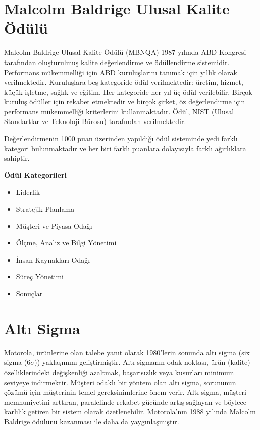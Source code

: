 \documentclass[
]{book}
\providecommand{\tightlist}{%
  \setlength{\itemsep}{0pt}\setlength{\parskip}{0pt}}
\begin{document}
\hypertarget{malcolm-baldrige-ulusal-kalite-uxf6duxfcluxfc}{%
\section{Malcolm Baldrige Ulusal Kalite Ödülü}\label{malcolm-baldrige-ulusal-kalite-uxf6duxfcluxfc}}

Malcolm Baldrige Ulusal Kalite Ödülü (MBNQA) 1987 yılında ABD Kongresi tarafından oluşturulmuş kalite değerlendirme ve ödüllendirme sistemidir. Performans mükemmelliği için ABD kuruluşlarını tanımak için yıllık olarak verilmektedir. Kuruluşlara beş kategoride ödül verilmektedir: üretim, hizmet, küçük işletme, sağlık ve eğitim. Her kategoride her yıl üç ödül verilebilir. Birçok kuruluş ödüller için rekabet etmektedir ve birçok şirket, öz değerlendirme için performans mükemmelliği kriterlerini kullanmaktadır. Ödül, NIST (Ulusal Standartlar ve Teknoloji Bürosu) tarafından verilmektedir.

Değerlendirmenin 1000 puan üzerinden yapıldığı ödül sisteminde yedi farklı kategori bulunmaktadır ve her biri farklı puanlara dolayısıyla farklı ağırlıklara sahiptir.

\textbf{Ödül Kategorileri}

\begin{itemize}
\tightlist
\item
  Liderlik
\item
  Stratejik Planlama
\item
  Müşteri ve Piyasa Odağı
\item
  Ölçme, Analiz ve Bilgi Yönetimi
\item
  İnsan Kaynakları Odağı
\item
  Süreç Yönetimi
\item
  Sonuçlar
\end{itemize}

\hypertarget{altux131-sigma}{%
\section{Altı Sigma}\label{altux131-sigma}}

Motorola, ürünlerine olan talebe yanıt olarak 1980'lerin sonunda altı sigma (six sigma (6\(\sigma\))) yaklaşımını geliştirmiştir. Altı sigmanın odak noktası, ürün (kalite) özelliklerindeki değişkenliği azaltmak, başarısızlık veya kusurları minimum seviyeye indirmektir. Müşteri odaklı bir yöntem olan altı sigma, sorununun çözümü için müşterinin temel gereksinimlerine önem verir. Altı sigma, müşteri memnuniyetini arttıran, paralelinde rekabet gücünde artış sağlayan ve böylece karlılık getiren bir sistem olarak özetlenebilir. Motorola'nın 1988 yılında Malcolm Baldrige ödülünü kazanması ile daha da yaygınlaşmıştır.
\end{document}
